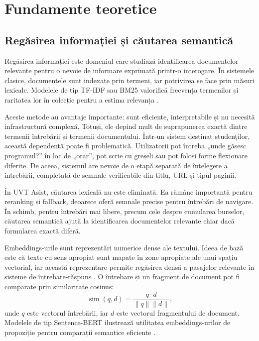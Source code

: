 \documentclass[12pt,a4paper]{report}
\theoremstyle{definition}
\theoremstyle{remark}
\begin{document}
\chapter{Fundamente teoretice}

\section{Regăsirea informației și căutarea semantică}
Regăsirea informației este domeniul care studiază identificarea documentelor relevante pentru o nevoie de informare exprimată printr-o interogare. În sistemele clasice, documentele sunt indexate prin termeni, iar potrivirea se face prin măsuri lexicale. Modelele de tip TF-IDF sau BM25 valorifică frecvența termenilor și raritatea lor în colecție pentru a estima relevanța \cite{Manning2008IR,Robertson2009BM25}.

Aceste metode au avantaje importante: sunt eficiente, interpretabile și nu necesită infrastructură complexă. Totuși, ele depind mult de suprapunerea exactă dintre termenii întrebării și termenii documentului. Într-un sistem destinat studenților, această dependență poate fi problematică. Utilizatorii pot întreba „unde găsesc programul?” în loc de „orar”, pot scrie cu greșeli sau pot folosi forme flexionare diferite. De aceea, sistemul are nevoie de o etapă separată de înțelegere a întrebării, completată de semnale verificabile din titlu, URL și tipul paginii.

În UVT Asist, căutarea lexicală nu este eliminată. Ea rămâne importantă pentru reranking și fallback, deoarece oferă semnale precise pentru întrebări de navigare. În schimb, pentru întrebări mai libere, precum cele despre cumularea burselor, căutarea semantică ajută la identificarea documentelor relevante chiar dacă formularea exactă diferă.

Embeddings-urile sunt reprezentări numerice dense ale textului. Ideea de bază este că texte cu sens apropiat sunt mapate în zone apropiate ale unui spațiu vectorial, iar această reprezentare permite regăsirea densă a pasajelor relevante în sisteme de întrebare-răspuns \cite{Karpukhin2020DPR,Reimers2019SBERT}. O întrebare și un fragment de document pot fi comparate prin similaritate cosinus:
\[
\operatorname{sim}(q,d)=\frac{q \cdot d}{\|q\|\|d\|},
\]
unde \(q\) este vectorul întrebării, iar \(d\) este vectorul fragmentului de document. Modelele de tip Sentence-BERT ilustrează utilitatea embeddings-urilor de propoziție pentru comparații semantice eficiente \cite{Reimers2019SBERT}.
\end{document}
